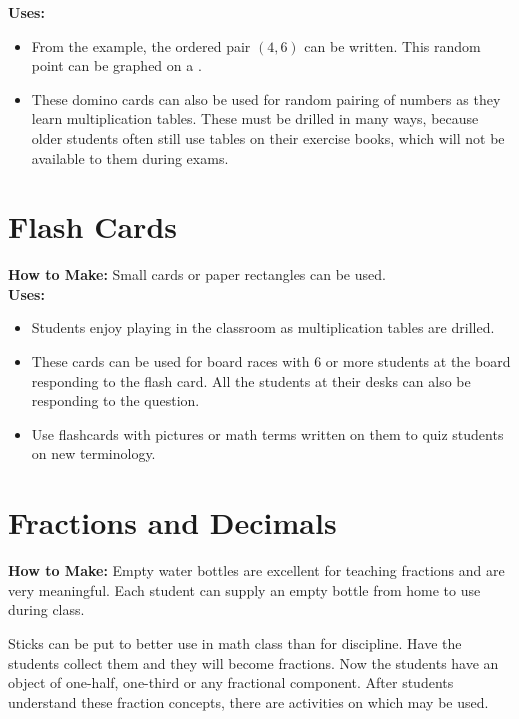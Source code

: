 \noindent\textbf{Uses:}
\begin{itemize}
\item From the example, the ordered pair $(4,6)$ can be written. This random point can be graphed on a .
\item These domino cards can also be used for random pairing of numbers as they learn multiplication tables. These must be drilled in many ways, because older students often still use tables on their exercise books, which will not be available to them during exams.
\end{itemize}

\section{Flash Cards} \label{flashcards}
\textbf{How to Make:} Small cards or paper rectangles can be used.\\

\noindent\textbf{Uses:}
\begin{itemize}
\item Students enjoy playing  in the classroom as multiplication tables are drilled.
\item These cards can be used for board races with 6 or more students at the board responding to the flash card. All the students at their desks can also be responding to the question.
\item Use flashcards with pictures or math terms written on them to quiz students on new terminology.
\end{itemize}

\section{Fractions and Decimals} \label{fracsanddecs}
\textbf{How to Make:} Empty water bottles are excellent for teaching fractions and are very meaningful. Each student can supply an empty bottle from home to use during class.

Sticks can be put to better use in math class than for discipline. Have the students collect them and they will become fractions. Now the students have an object of one-half, one-third or any fractional component. After students understand these fraction concepts, there are activities on  which may be used. \\

